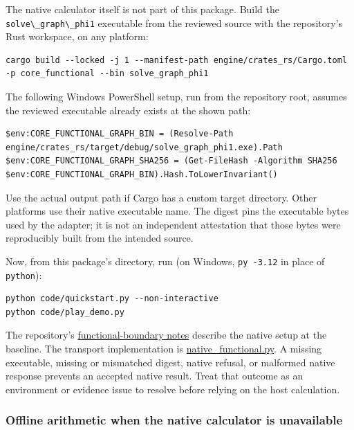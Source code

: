 \documentclass[
  11pt,
]{article}
\newcommand{\passthrough}[1]{#1}
\begin{document}
The native calculator itself is not part of this package. Build the
\passthrough{\lstinline!solve\_graph\_phi1!} executable from the
reviewed source with the repository's Rust workspace, on any platform:

\begin{lstlisting}
cargo build --locked -j 1 --manifest-path engine/crates_rs/Cargo.toml -p core_functional --bin solve_graph_phi1
\end{lstlisting}

The following Windows PowerShell setup, run from the repository root,
assumes the reviewed executable already exists at the shown path:

\begin{lstlisting}
$env:CORE_FUNCTIONAL_GRAPH_BIN = (Resolve-Path engine/crates_rs/target/debug/solve_graph_phi1.exe).Path
$env:CORE_FUNCTIONAL_GRAPH_SHA256 = (Get-FileHash -Algorithm SHA256 $env:CORE_FUNCTIONAL_GRAPH_BIN).Hash.ToLowerInvariant()
\end{lstlisting}

Use the actual output path if Cargo has a custom target directory. Other
platforms use their native executable name. The digest pins the
executable bytes used by the adapter; it is not an independent
attestation that those bytes were reproducibly built from the intended
source.

Now, from this package's directory, run (on Windows,
\passthrough{\lstinline!py -3.12!} in place of
\passthrough{\lstinline!python!}):

\begin{lstlisting}
python code/quickstart.py --non-interactive
python code/play_demo.py
\end{lstlisting}

The repository's
\href{https://github.com/dbccpage/the_symbol_game/blob/52cb5457f6c485ba548cfd292f6012a941ed22cf/education/FUNCTIONAL_BOUNDARY.md}{functional-boundary
notes} describe the native setup at the baseline. The transport
implementation is
\href{https://github.com/dbccpage/the_symbol_game/blob/52cb5457f6c485ba548cfd292f6012a941ed22cf/atlas/coda_atlas/symbol_game/005_pfp_practitioners_field_manual/code/native_functional.py}{native\_functional.py}.
A missing executable, missing or mismatched digest, native refusal, or
malformed native response prevents an accepted native result. Treat that
outcome as an environment or evidence issue to resolve before relying on
the host calculation.

\subsubsection{Offline arithmetic when the native calculator is
unavailable}\label{offline-arithmetic-when-the-native-calculator-is-unavailable}
\end{document}
